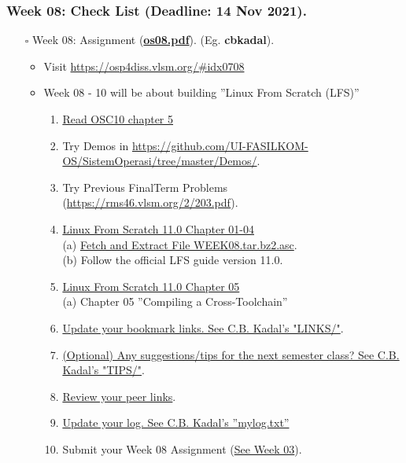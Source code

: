 \begin{frame}
\frametitle{Week 08: Check List (Deadline: 14 Nov 2021).}
\begin{itemize}
\item [$\square$] Week 08: Assignment (\href{https://os.vlsm.org/Slides/os08.pdf}{\textbf{os08.pdf}}).
(Eg. \textbf{cbkadal}).
\begin{itemize}
\item Visit \url{https://osp4diss.vlsm.org/\#idx0708}
\item Week 08 - 10 will be about building ''Linux From Scratch (LFS)''
\begin{enumerate}
\item \href{https://www.os-book.com/OS10/slide-dir/}{Read OSC10 chapter 5}
\item Try Demos in {\tiny \url{https://github.com/UI-FASILKOM-OS/SistemOperasi/tree/master/Demos/}}.
\item Try Previous FinalTerm Problems {\tiny (\url{https://rms46.vlsm.org/2/203.pdf})}.
\item \href{https://osp4diss.vlsm.org/W08-01.html}{Linux From Scratch 11.0 Chapter 01-04} \\
(a) \href{https://os.vlsm.org/WEEK/WEEK08.tar.bz2.asc}{Fetch and Extract File WEEK08.tar.bz2.asc}.\\
(b) Follow the official LFS guide version 11.0.
\item \href{https://osp4diss.vlsm.org/W08-02.html}{Linux From Scratch 11.0 Chapter 05} \\
(a) Chapter 05 ''Compiling a Cross-Toolchain''
\item \href{https://cbkadal.github.io/os212/LINKS/}{Update your bookmark links. See C.B. Kadal's "LINKS/"}.
\item \href{https://cbkadal.github.io/os212/TIPS/}{(Optional) Any suggestions/tips for the next semester class? See C.B. Kadal's "TIPS/"}.
\item \href{https://osp4diss.vlsm.org/W02-05.html}{Review your peer links}.
\item \href{https://cbkadal.github.io/os212/TXT/mylog.txt}{Update your log. See C.B. Kadal's ''mylog.txt''}
\item Submit your Week 08 Assignment (\href{https://osp4diss.vlsm.org/W03-06.html}{See Week 03}).
\end{enumerate}
\end{itemize}
\end{itemize}
\end{frame}

